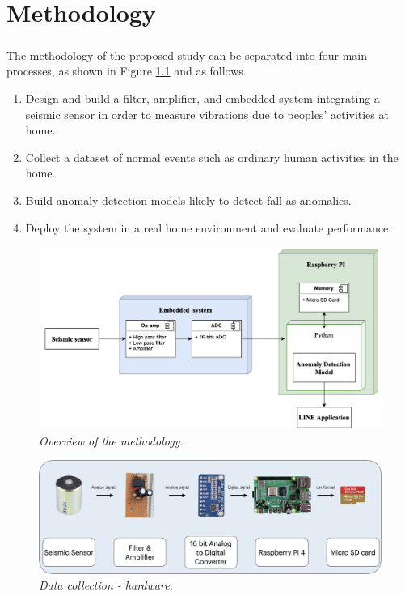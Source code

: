 \setlength{\parindent}{0in} 
\setlength{\parskip}{1em}
\setlength{\baselineskip}{1.6em}

\chapter{Methodology}
\label{ch:methodology}
\paragraph{}
The methodology of the proposed study can be separated into four main processes, as shown in Figure \ref{fig:system_overview} and as follows.
\begin{enumerate}
\item Design and build a filter, amplifier, and embedded system integrating a seismic sensor in order to measure vibrations due to peoples' activities at home.
\item Collect a dataset of normal events such as ordinary human activities in the home.
\item Build anomaly detection models likely to detect fall as anomalies.
\item Deploy the system in a real home environment and evaluate performance.
\end{enumerate}

\begin{figure}[H]
  \centering
  \caption[Overview of the methodology.]{\emph{Overview of the methodology.}}\label{fig:system_overview}
  \includegraphics[scale = 0.15]{figures/system_overview_2.jpg}  
\end{figure}

\begin{figure}[H]
  \centering
  \caption[Data collection - hardware.]{\emph{Data collection - hardware.}}\label{fig:data_collection}
  \includegraphics[scale = 0.13]{figures/meth_data_collection.jpg}  
\end{figure}

